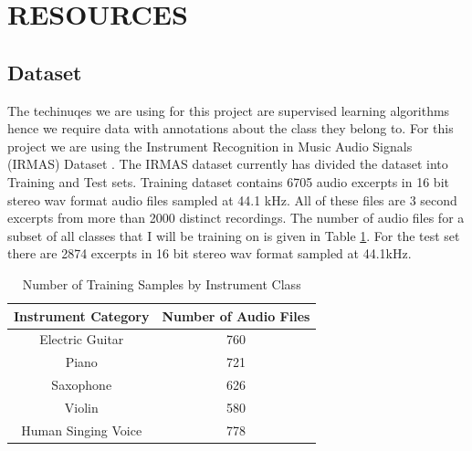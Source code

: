 \documentclass[letterpaper, 12 pt, conference]{ieeeconf}  %
\begin{document}


\section{RESOURCES}

\subsection{Dataset}
The techinuqes we are using for this project are supervised learning algorithms hence we require data with annotations about the class they belong to. For this project we are using the Instrument Recognition in Music Audio Signals (IRMAS) Dataset \cite{IRMAS_Dataset}. The IRMAS dataset currently has divided the dataset into Training and Test sets. Training dataset contains 6705 audio excerpts in 16 bit stereo wav format audio files sampled at 44.1 kHz. All of these files are 3 second excerpts from more than 2000 distinct recordings. The number of audio files for a subset of all classes that I will be training on is given in Table \ref{tab:pd}. For the test set there are 2874 excerpts in 16 bit stereo wav format sampled at 44.1kHz.

\begin{table}
\centering
\caption{Number of Training Samples by Instrument Class}
\begin{tabular}{| c || c |} %
\hline %
 Instrument Category &  Number of Audio Files \\
   \hline \hline
\hline
Electric Guitar &  760 \\
\hline
Piano  &   721 \\
\hline
Saxophone  &   626 \\
\hline
Violin &   580 \\
\hline
Human Singing Voice  &   778 \\
\hline
   \end{tabular}
\label{tab:pd} 
\end{table}
\end{document}
